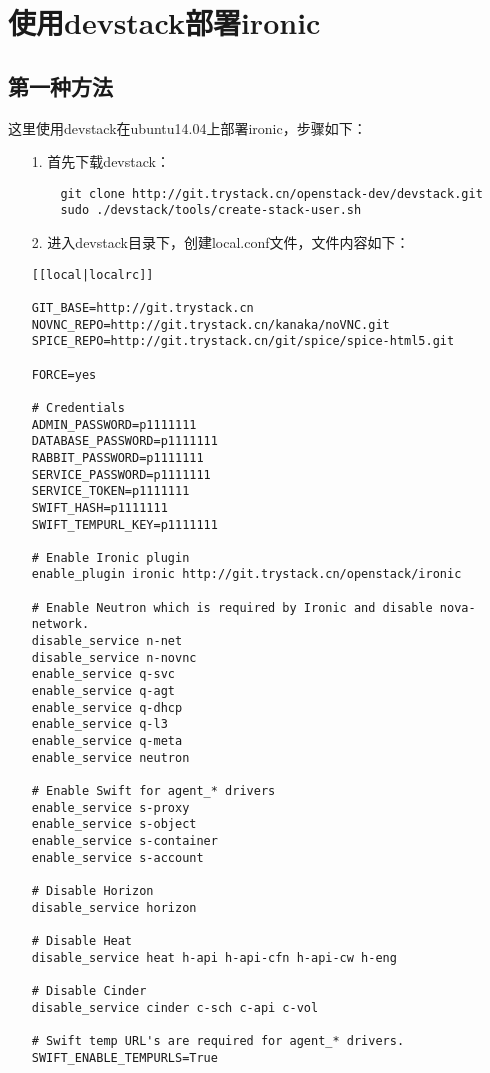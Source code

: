 \documentclass[a4paper,left=1.5cm,right=1.5cm,11pt]{article}
\begin{document}
\tableofcontents

\clearpage

\section{使用devstack部署ironic}
\subsection{第一种方法}
	这里使用devstack在ubuntu14.04上部署ironic，步骤如下：
	\begin{itemize}
		\item[1.] 首先下载devstack：
		\begin{lstlisting}
	git clone http://git.trystack.cn/openstack-dev/devstack.git
	sudo ./devstack/tools/create-stack-user.sh
		\end{lstlisting}

		\item[2.] 进入devstack目录下，创建local.conf文件，文件内容如下：
		\begin{lstlisting}
[[local|localrc]]

GIT_BASE=http://git.trystack.cn
NOVNC_REPO=http://git.trystack.cn/kanaka/noVNC.git
SPICE_REPO=http://git.trystack.cn/git/spice/spice-html5.git

FORCE=yes

# Credentials
ADMIN_PASSWORD=p1111111
DATABASE_PASSWORD=p1111111
RABBIT_PASSWORD=p1111111
SERVICE_PASSWORD=p1111111
SERVICE_TOKEN=p1111111
SWIFT_HASH=p1111111
SWIFT_TEMPURL_KEY=p1111111

# Enable Ironic plugin
enable_plugin ironic http://git.trystack.cn/openstack/ironic

# Enable Neutron which is required by Ironic and disable nova-network.
disable_service n-net
disable_service n-novnc
enable_service q-svc
enable_service q-agt
enable_service q-dhcp
enable_service q-l3
enable_service q-meta
enable_service neutron

# Enable Swift for agent_* drivers
enable_service s-proxy
enable_service s-object
enable_service s-container
enable_service s-account

# Disable Horizon
disable_service horizon

# Disable Heat
disable_service heat h-api h-api-cfn h-api-cw h-eng

# Disable Cinder
disable_service cinder c-sch c-api c-vol

# Swift temp URL's are required for agent_* drivers.
SWIFT_ENABLE_TEMPURLS=True


\end{lstlisting}
\end{itemize}
\end{document}
